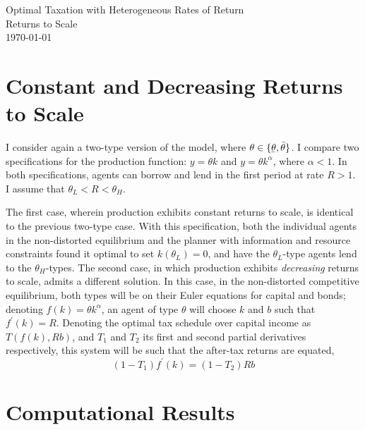\documentclass[11pt]{article}
\newcommand{\ubar}[1]{\underaccent{\bar}{#1}}
\newcommand{\p}{\prime}
\begin{document}
    \begin{flushleft}
        Optimal Taxation with Heterogeneous Rates of Return \\
        Returns to Scale \\
        \today
    \end{flushleft}

\section{Constant and Decreasing Returns to Scale} 

I consider again a two-type version of the model, where \( \theta\in\{\ubar{\theta}, \bar{\theta}\} \). I compare two specifications for the production function: \( y = \theta k \) and \( y = \theta k^\alpha \), where \( \alpha < 1 \). In both specifications, agents can borrow and lend in the first period at rate \( R > 1 \). I assume that \( \theta_L < R < \theta_H \).

The first case, wherein production exhibits constant returns to scale, is identical to the previous two-type case. With this specification, both the individual agents in the non-distorted equilibrium and the planner with information and resource constraints found it optimal to set \( k(\theta_L) = 0 \), and have the \( \theta_L \)-type agents lend to the \( \theta_H \)-types. The second case, in which production exhibits \textit{decreasing} returns to scale, admits a different solution. In this case, in the non-distorted competitive equilibrium, both types will be on their Euler equations for capital and bonds; denoting \( f(k) = \theta k^\alpha \), an agent of type \( \theta \) will choose \( k \) and \( b \) such that \( f^\p(k) = R \). Denoting the optimal tax schedule over capital income as \( T(f(k),Rb) \), and \( T_1 \) and \( T_2 \) its first and second partial derivatives respectively, this system will be such that the after-tax returns are equated,
\begin{equation}
    (1 - T_1)f^\p(k) = (1 - T_2)Rb
\end{equation}

\section{Computational Results}
\end{document}
